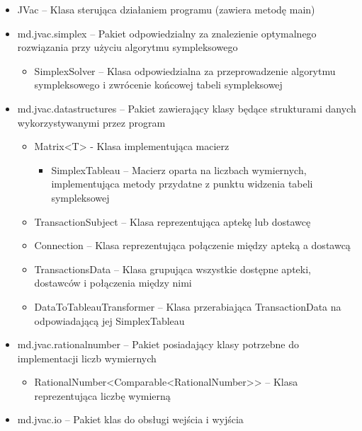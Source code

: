 \documentclass[]{article}
\begin{document}
    \begin{itemize}
        \item
        JVac -- Klasa sterująca działaniem programu (zawiera metodę main)
        \item
        md.jvac.simplex -- Pakiet odpowiedzialny za znalezienie optymalnego
        rozwiązania przy użyciu algorytmu sympleksowego

        \begin{itemize}
            \item
            SimplexSolver -- Klasa odpowiedzialna za przeprowadzenie algorytmu
            sympleksowego i zwrócenie końcowej tabeli sympleksowej
        \end{itemize}
        \item
        md.jvac.datastructures -- Pakiet zawierający klasy będące strukturami
        danych wykorzystywanymi przez program

        \begin{itemize}
            \item
            Matrix\textless{}T\textgreater{} - Klasa implementująca macierz

            \begin{itemize}
                \item
                SimplexTableau -- Macierz oparta na liczbach wymiernych,
                implementująca metody przydatne z punktu widzenia tabeli
                sympleksowej
            \end{itemize}
            \item
            TransactionSubject -- Klasa reprezentująca aptekę lub dostawcę
            \item
            Connection -- Klasa reprezentująca połączenie między apteką a
            dostawcą
            \item
            TransactionsData -- Klasa grupująca wszystkie dostępne apteki,
            dostawców i połączenia między nimi
            \item
            DataToTableauTransformer -- Klasa przerabiająca TransactionData na
            odpowiadającą jej SimplexTableau
        \end{itemize}
        \item
        md.jvac.rationalnumber -- Pakiet posiadający klasy potrzebne do
        implementacji liczb wymiernych

        \begin{itemize}
            \item
            RationalNumber\textless{}Comparable\textless{}RationalNumber\textgreater{}\textgreater{}
            -- Klasa reprezentująca liczbę wymierną
        \end{itemize}
        \item
        md.jvac.io -- Pakiet klas do obsługi wejścia i wyjścia


\end{itemize}
\end{document}
